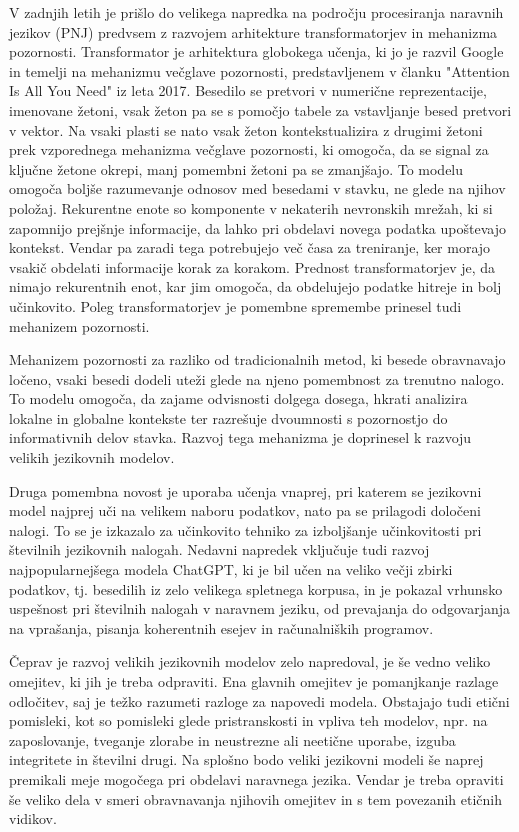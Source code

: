\documentclass[a4paper,12pt,openright]{book}
\begin{document}
V zadnjih letih je prišlo do velikega napredka na področju procesiranja naravnih jezikov (PNJ) predvsem z razvojem arhitekture transformatorjev in mehanizma pozornosti.
Transformator je arhitektura globokega učenja, ki jo je razvil Google in temelji na mehanizmu večglave pozornosti, predstavljenem v članku "Attention Is All You Need" iz leta 2017.  \cite{datacamp_attention_2024} 
Besedilo se pretvori v numerične reprezentacije, imenovane žetoni, vsak žeton pa se s pomočjo tabele za vstavljanje besed pretvori v vektor. Na vsaki plasti se nato vsak žeton kontekstualizira z drugimi žetoni prek vzporednega mehanizma večglave pozornosti, ki omogoča, da se signal za ključne žetone okrepi, manj pomembni žetoni pa se zmanjšajo. To modelu omogoča boljše razumevanje odnosov med besedami v stavku, ne glede na njihov položaj.
Rekurentne enote so komponente v nekaterih nevronskih mrežah, ki si zapomnijo prejšnje informacije, da lahko pri obdelavi novega podatka upoštevajo kontekst. Vendar pa zaradi tega potrebujejo več časa za treniranje, ker morajo vsakič obdelati informacije korak za korakom.
Prednost transformatorjev je, da nimajo rekurentnih enot, kar jim omogoča, da obdelujejo podatke hitreje in bolj učinkovito. Poleg transformatorjev je pomembne spremembe prinesel tudi mehanizem pozornosti.
\cite{NIPS2017_3f5ee243}

Mehanizem pozornosti za razliko od tradicionalnih metod, ki besede obravnavajo ločeno, vsaki besedi dodeli uteži glede na njeno pomembnost za trenutno nalogo. To modelu omogoča, da zajame odvisnosti dolgega dosega, hkrati analizira lokalne in globalne kontekste ter razrešuje dvoumnosti s pozornostjo do informativnih delov stavka. Razvoj tega mehanizma je doprinesel k razvoju velikih jezikovnih modelov.
\cite{datacamp_attention_2024}
\cite{KASNECI2023102274}

Druga pomembna novost je uporaba učenja vnaprej, pri katerem se jezikovni model najprej uči na velikem naboru podatkov, nato pa se prilagodi določeni nalogi. To se je izkazalo za učinkovito tehniko za izboljšanje učinkovitosti pri številnih jezikovnih nalogah.
Nedavni napredek vključuje tudi razvoj najpopularnejšega modela ChatGPT, ki je bil učen na veliko večji zbirki podatkov, tj. besedilih iz zelo velikega spletnega korpusa, in je pokazal vrhunsko uspešnost pri številnih nalogah v naravnem jeziku, od prevajanja do odgovarjanja na vprašanja, pisanja koherentnih esejev in računalniških programov.
\cite{KASNECI2023102274}

Čeprav je razvoj velikih jezikovnih modelov zelo napredoval, je še vedno veliko omejitev, ki jih je treba odpraviti. Ena glavnih omejitev je pomanjkanje razlage odločitev, saj je težko razumeti razloge za napovedi modela. Obstajajo tudi etični pomisleki, kot so pomisleki glede pristranskosti in vpliva teh modelov, npr. na zaposlovanje, tveganje zlorabe in neustrezne ali neetične uporabe, izguba integritete in številni drugi. Na splošno bodo veliki jezikovni modeli še naprej premikali meje mogočega pri obdelavi naravnega jezika. Vendar je treba opraviti še veliko dela v smeri obravnavanja njihovih omejitev in s tem povezanih etičnih vidikov.
\end{document}
